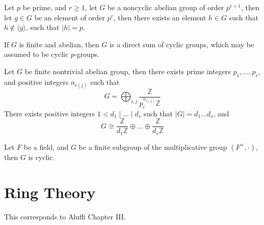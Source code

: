 \documentclass[openany]{book}
\newcommand{\Z}{\mathbb{Z}}
\newcommand{\la}{\langle}
\newcommand{\ra}{\rangle}
\begin{document}
\begin{prop}
    Let $p$ be prime, and $r\geq 1$, let $G$ be a noncyclic abelian group of order $p^{r+1}$, then let $g\in G$ be an element of order $p^r$, then there exists an element $h\in G$ such that $h\not\in\la g\ra$, such that $|h|=p$.

    If $G$ is finite and abelian, then $G$ is a direct sum of cyclic groups, which may be assumed to be cyclic $p$-groups.
\end{prop}



\begin{thm}
    Let $G$ be finite nontrivial abelian group, then there exists prime integers $p_1,\dots, p_r$, and positive integers $n_{i(j)}$ such that 
    \begin{equation*}
        G=\bigoplus_{i,j}\frac{\Z}{p_i^{n_{i(j)}}\Z}
    \end{equation*}
    There exists positive integers $1<d_1\mid \dots\mid d_s$ such that $|G|=d_1\dots d_s$, and 
    \begin{equation*}
        G\cong\frac{\Z}{d_1\Z}\oplus\dots\oplus\frac{\Z}{d_s\Z}
    \end{equation*}
\end{thm}



\begin{thm}
    Let $F$ be a field, and $G$ be a finite subgroup of the multiplicative group $(F^\times, \cdot)$, then $G$ is cyclic.
\end{thm}












































\chapter{Ring Theory}
This corresponds to Aluffi Chapter III.
\end{document}

